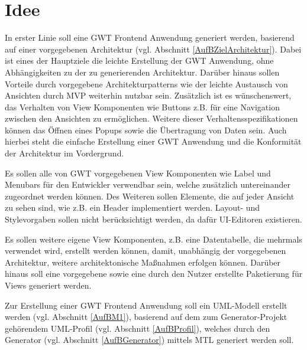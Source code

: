\chapter{Idee}
\label{Idee}
In erster Linie soll eine GWT Frontend Anwendung generiert werden, basierend auf
einer vorgegebenen Architektur (vgl. Abschnitt \ref{AufBZielArchitektur}). Dabei
ist eines der Hauptziele die leichte Erstellung der GWT Anwendung, ohne
Abhängigkeiten zu der zu generierenden Architektur. Darüber hinaus sollen
Vorteile durch vorgegebene Architekturpatterns wie der leichte Austausch von
Ansichten durch MVP weiterhin nutzbar sein. Zusätzlich ist es wünschenswert, das
Verhalten von View Komponenten wie Buttons z.B. für eine Navigation zwischen
den Ansichten zu ermöglichen. Weitere dieser Verhaltensspezifikationen können
das Öffnen eines Popups sowie die Übertragung von Daten sein. Auch hierbei
steht die einfache Erstellung einer GWT Anwendung und die Konformität
der Architektur im Vordergrund.

Es sollen alle von GWT vorgegebenen View Komponenten wie Label und
Menubars für den Entwickler verwendbar sein, welche zusätzlich
untereinander zugeordnet werden können. Des Weiteren sollen Elemente, die auf
jeder Ansicht zu sehen sind, wie z.B. ein Header implementiert werden. Layout-
und Stylevorgaben sollen nicht berücksichtigt werden, da dafür UI-Editoren
existieren.

Es sollen weitere eigene View Komponenten, z.B. eine Datentabelle, die mehrmals
verwendet wird, erstellt werden können, damit, unabhängig der vorgegebenen
Architektur, weitere architektonische Maßnahmen erfolgen können. Darüber hinaus soll
eine vorgegebene sowie eine durch den Nutzer erstellte Paketierung
für Views generiert werden.

Zur Erstellung einer GWT Frontend Anwendung soll ein UML-Modell
erstellt werden (vgl. Abschnitt \ref{AufBM1}), basierend auf dem zum
Generator-Projekt gehörendem UML-Profil (vgl. Abschnitt \ref{AufBProfil}),
welches durch den Generator (vgl. Abschnitt \ref{AufBGenerator}) mittels
MTL generiert werden soll.

